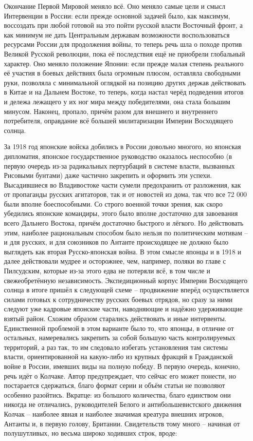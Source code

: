 Окончание Первой Мировой меняло всё. Оно меняло самые цели и смысл Интервенции в России: если прежде основной задачей было, как максимум, воссоздать при любой готовой на это пойти русской власти Восточный фронт, а как минимум не дать Центральным державам возможности воспользоваться ресурсами России для продолжения войны, то теперь речь шла о походе против Великой Русской революции, пока её последствия ещё не приобрели глобальный характер. Оно меняло положение Японии: если прежде малая степень реального её участия в боевых действиях была огромным плюсом, оставляла свободными руки, позволяла с минимальной оглядкой на позицию других держав действовать в Китае и на Дальнем Востоке, то теперь, когда настал черёд подведения итогов и дележа лежащего у их ног мира между победителями, она стала большим минусом. Наконец, пропало, причём разом для внешнего и внутреннего потребителя, оправдание всё большей милитаризации Империи Восходящего солнца.

За 1918 год японские войска добились в России довольно многого, но японская дипломатия, японское государственное руководство оказалось неспособно (в первую очередь из-за радикальных пертурбаций в системе власти, вызванных Рисовыми бунтами) даже частично закрепить и оформить эти успехи. Высадившиеся во Владивостоке части сумели предохранить от разложения, как от пропаганды русских агитаторов, так и от новостей из дома, так что все 72 000 были вполне боеспособными. Со строго военной точки зрения, как скоро убедились японские командиры, этого было вполне достаточно для завоевания всего Дальнего Востока, причём достаточно быстрого и лёгкого. Но действовать этим, наиболее рациональным способом было нельзя по политическим мотивам – и для русских, и для союзников по Антанте происходящее не должно было выглядеть как вторая Русско-японская война. В этом смысле японцы и в 1918 и далее действовали мудрее и осторожнее, чем, например, поляки во главе с Пилсудским, которые из-за этого едва не потеряли всё, в том числе и свежеобретённую независимость. Экспедиционный корпус Империи Восходящего солнца в итоге пришёл к следующей схеме – продвижение вперёд осуществляется силами готовых к сотрудничеству русских боевых отрядов, но сразу за ними следуют уже кадровые японские части, наводняющие и надёжно удерживающие взятый район. Схожим образом старались действовать и иные интервенты. Единственной проблемой в этом варианте было то, что японцы, в отличие от остальных, намеревались закрепить за собой большую часть контролируемых территорий, а раз так, то им следовало избегать установления там системы власти, ориентированной на какую-либо из крупных фракций в Гражданской войне в России, имевших виды на полную победу. В первую очередь, конечно, речь идёт о Колчаке. Автор предупреждает, что сейчас его может понести, но постарается сдержаться, благо формат серии и объём статьи не позволяют особенно разойтись. Вкратце: из большого количества, благо единством они никогда не отличались, руководителей Белого и антибольшевистского движения Колчак – наиболее явная и наиболее значимая креатура внешних игроков, Антанты и, в первую голову, Британии. Свидетельств тому много – начиная от полушутливых, но весьма широко ходивших строк, вроде:

